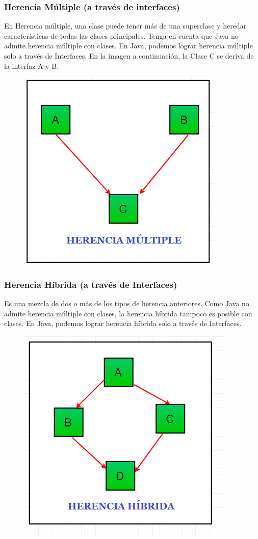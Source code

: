 \documentclass[12pt,a4paper]{report}
\begin{document}
{\subsubsection*{Herencia Múltiple (a través de interfaces)}
En Herencia múltiple, una clase puede tener más de una superclase y heredar características de todas las clases principales. Tenga en cuenta que Java no admite herencia múltiple con clases. En Java, podemos lograr herencia múltiple solo a través de Interfaces. En la imagen a continuación, la Clase C se deriva de la interfaz A y B.
\begin{figure}[hbtp]
\centering
\includegraphics[scale=0.4]{herenciamultiple.png}
\end{figure}

\subsubsection{Herencia Híbrida (a través de Interfaces)}
Es una mezcla de dos o más de los tipos de herencia anteriores. Como Java no admite herencia múltiple con clases, la herencia híbrida tampoco es posible con clases. En Java, podemos lograr herencia híbrida solo a través de Interfaces.
\begin{figure}[hbtp]
\centering
\includegraphics[scale=0.5]{herenciahibrida.png}
\end{figure}

}
\end{document}
